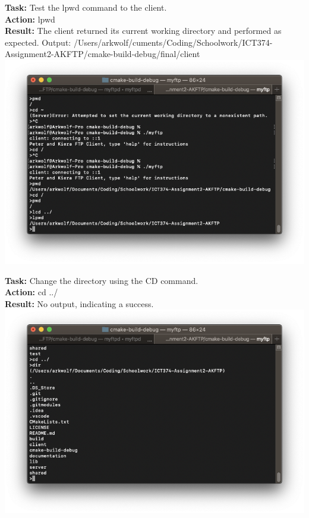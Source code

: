 \documentclass{article}
\begin{document}
\textbf{Task:} Test the lpwd command to the client.\\
\textbf{Action:} lpwd\\
\textbf{Result:} The client returned its current working directory and performed as expected. Output: /Users/arkwolf/cuments/Coding/Schoolwork/ICT374-Assignment2-AKFTP/cmake-build-debug/final/client\\
\includegraphics[width=\textwidth]{testpictures/lpwd}

\textbf{Task:} Change the directory using the CD command.\\
\textbf{Action:} cd ../\\
\textbf{Result:} No output, indicating a success.\\
\includegraphics[width=\textwidth]{testpictures/cdserver}
\end{document}
